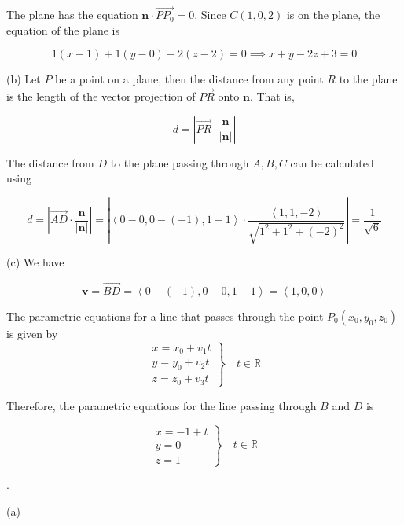 \documentclass{article}
\begin{document}
\hfill

\noindent The plane has the equation $\mathbf n\cdot\overrightarrow{PP_0}=0$. Since $C(1,0,2)$ is on the plane, the equation of the plane is

\[\boxed{1(x-1)+1(y-0)-2(z-2)=0\implies x+y-2z+3=0}\]

\hfill

\noindent (b) Let $P$ be a point on a plane, then the distance from any point $R$ to the plane is the length of the vector projection of $\overrightarrow{PR}$ onto $\mathbf n$. That is,

\[d=\left|\overrightarrow{PR}\cdot\frac{\mathbf n}{|\mathbf n|}\right|\]

\hfill

\noindent The distance from $D$ to the plane passing through $A, B, C$ can be calculated using

\[d=\left|\overrightarrow{AD}\cdot\frac{\mathbf n}{|\mathbf n|}\right|=\left|\left\langle0-0,0-(-1),1-1\right\rangle\cdot\frac{\left\langle1,1,-2\right\rangle}{\sqrt{1^2+1^2+(-2)^2}}\right|=\boxed{\frac1{\sqrt6}}\]

\noindent (c) We have

\[\mathbf{v}=\overrightarrow{BD}=\left\langle0-(-1),0-0,1-1\right\rangle=\left\langle1,0,0\right\rangle\]

\hfill

\noindent The parametric equations for a line that passes through the point $P_0(x_0,y_0,z_0)$ is given by
\[\left.\begin{array}{c}
x=x_0+v_1t\\
y=y_0+v_2t\\
z=z_0+v_3t
\end{array}\right\}\quad t\in\mathbb{R}\]

\hfill

\noindent Therefore, the parametric equations for the line passing through $B$ and $D$ is

\[\boxed{\left.\begin{array}{l}
x=-1+t\\
y=0\\
z=1
\end{array}\right\}\quad t\in\mathbb{R}}\]

\hfill 

.

\hfill

\noindent (a)
\begin{center}
\end{center}
\end{document}
